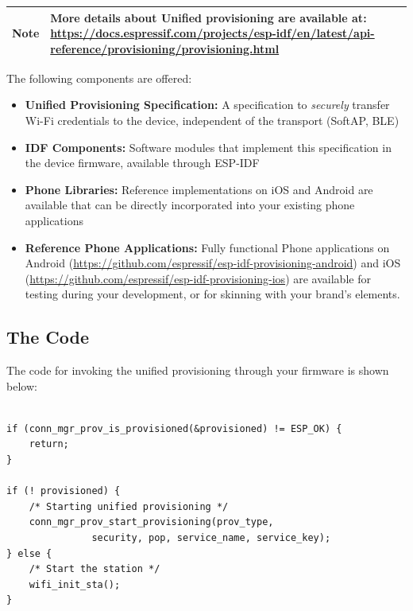 \documentclass[11pt,fleqn]{book} %
\newcommand{\ksnotebox}[1]{\begin{tabularx}{\textwidth}{ |c|X| }
\hline
\cellcolor{lightgray} \textbf{Note} & #1 \\
\hline
\end{tabularx}} %
\begin{document}
\ksnotebox{More details about Unified provisioning are available at: \url{https://docs.espressif.com/projects/esp-idf/en/latest/api-reference/provisioning/provisioning.html}}

The following components are offered:
\begin{itemize}
    \item \textbf{Unified Provisioning Specification:} A specification to \textit{securely} transfer Wi-Fi credentials to the device, independent of the transport (SoftAP, BLE)
    \item \textbf{IDF Components:} Software modules that implement this specification in the device firmware, available through ESP-IDF
    \item \textbf{Phone Libraries:} Reference implementations on iOS and Android are available that can be directly incorporated into your existing phone applications
    \item \textbf{Reference Phone Applications:} Fully functional Phone applications on Android (\url{https://github.com/espressif/esp-idf-provisioning-android}) and iOS (\url{https://github.com/espressif/esp-idf-provisioning-ios}) are available for testing during your development, or for skinning with your brand's elements.
\end{itemize}

\subsection{The Code}\label{sec:unified_prov}
The code for invoking the unified provisioning through your firmware is shown below:
\begin{verbatim}

if (conn_mgr_prov_is_provisioned(&provisioned) != ESP_OK) {
    return;
}

if (! provisioned) {
    /* Starting unified provisioning */
    conn_mgr_prov_start_provisioning(prov_type,
               security, pop, service_name, service_key);
} else {
    /* Start the station */
    wifi_init_sta();
}
\end{verbatim}
\end{document}
